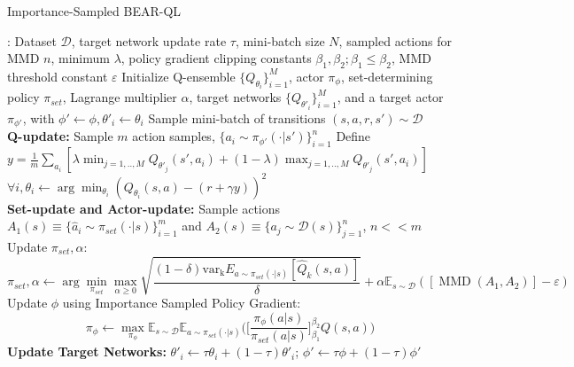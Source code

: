 \begin{algorithm}[H]
\small
\caption{Importance-Sampled BEAR-QL}
\begin{algorithmic}[1]
    \INPUT: Dataset $\mathcal{D}$, target network update rate $\tau$, mini-batch size $N$, sampled actions for MMD $n$, minimum $\lambda$, policy gradient clipping constants $\beta_1, \beta_2; \beta_1 \leq \beta_2$, MMD threshold constant $\varepsilon$
    \STATE Initialize Q-ensemble $\{Q_{\theta_i} \}_{i=1}^{M}$, actor $\pi_{\phi}$, set-determining policy $\pi_{set}$, Lagrange multiplier $\alpha$, target networks $\{ Q_{\theta'_i} \}_{i=1}^M$, and a target actor $\pi_{\phi'}$, with $\phi' \leftarrow \phi, \theta'_i \leftarrow \theta_i$
        \STATE Sample mini-batch of transitions $(s, a, r, s') \sim \mathcal{D}$\\
        \textbf{Q-update:}
            \STATE Sample $m$ action samples, $\{a_i \sim \pi_{\phi'}(\cdot|s')\}_{i=1}^n$
            \STATE Define $y = \frac{1}{m} \sum_{a_i} [ \lambda \min_{j=1,..,M} Q_{\theta'_j}(s', a_i) + (1 - \lambda) \max_{j=1,..,M} Q_{\theta'_j}(s', a_i)]$
            \STATE $\forall i, \theta_i \leftarrow \arg \min_{\theta_i} (Q_{\theta_i}(s, a) - (r + \gamma y))^2$\\
        \textbf{Set-update and Actor-update:}
        \STATE Sample actions $A_1(s) \equiv \{ \hat{a}_i \sim \pi_{set}(\cdot | s) \}_{i=1}^{m}$ and $A_2(s) \equiv \{ a_j \sim \mathcal{D}(s)\}_{j=1}^{n}$, $n << m$
        \STATE Update $\pi_{set}, \alpha$: $$ \pi_{set}, \alpha \leftarrow \arg \min_{\pi_{set}} \max_{\alpha \geq 0} \sqrt{\frac{(1 - \delta) \operatorname{var_k}E_{a \sim \pi_{set}(\cdot |s) }[\hat{Q}_k(s, a)]}{\delta}} + \alpha \mathbb{E}_{s \sim \mathcal{D}} ([\operatorname{MMD}(A_1, A_2)] -  \varepsilon) $$
        \STATE Update $\phi$ using Importance Sampled Policy Gradient: 
        $$ \pi_{\phi} \leftarrow  \max_{\pi_{\phi}} \mathbb{E}_{s \sim \mathcal{D}} \mathbb{E}_{a \sim \pi_{set}(\cdot|s)} \Big( \Big[ \frac{\pi_\phi(a|s)}{\pi_{set}(a|s)} \Big]_{\beta_1}^{\beta_2} Q(s, a) \Big)$$
        \STATE \textbf{Update Target Networks: } $\theta'_i \leftarrow \tau \theta_i + (1 - \tau)\theta'_i$; $\phi' \leftarrow \tau \phi + (1 -\tau) \phi'$ 
    \ENDFOR
\end{algorithmic}
\label{alg:actor_critic}
\end{algorithm}

\fi


